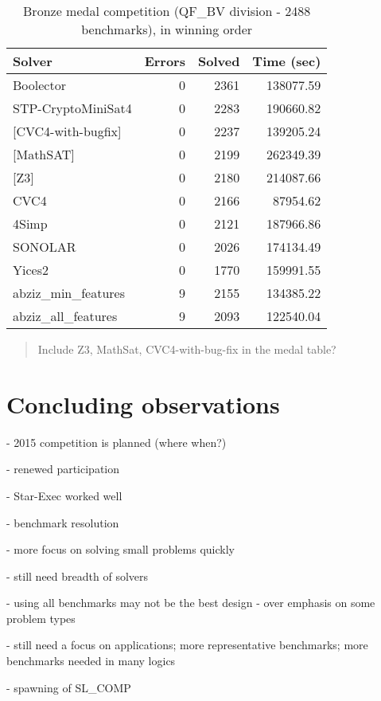 \documentclass[twosize,11pt]{article}
\newcommand{\comment}[2]{\begin{quote}\sc #1\marginpar{\textcolor{red}{$\ast^{\mbox{#2}}$}}\end{quote}}
\newcommand{\davidc}[1]{\comment{#1}{DC}}
\begin{document}
\begin{table}
\centering
\begin{tabular}{|l|rrr|}
\hline
 Solver & Errors & Solved & Time (sec)\\
\hline
Boolector &	0  &		2361  &		138077.59 \\
STP-CryptoMiniSat4 & 0  &		2283  &		190660.82 	\\
{[}CVC4-with-bugfix] &	0  &		2237 	 &		139205.24 \\
{[}MathSAT]  &	0  &		2199 	 &		262349.39 \\
{[}Z3]  & 	0  &		2180 	 &		214087.66 	\\
CVC4  &	0  &		2166 	 &		87954.62 	\\
4Simp &	0 &	2121 	 &		187966.86 \\
SONOLAR &	0  &		2026  &	 	174134.49 \\
Yices2 &	0  &		1770  &	 	159991.55 \\
abziz\_min\_features &	9  &		2155 	 &	 	134385.22 \\
abziz\_all\_features &	9  &		2093 	 &	 	122540.04 \\
\hline
\end{tabular}
\vspace{.2in}
\caption{Bronze medal competition (QF\_BV division - 2488 benchmarks), in winning order}
\label{Table:bronze}
\end{table}

\davidc{Include Z3, MathSat, CVC4-with-bug-fix in the medal table?}


\section{Concluding observations}
\label{sec:conclusion}

- 2015 competition is planned (where when?)

- renewed participation

- Star-Exec worked well

- benchmark resolution

- more focus on solving small problems quickly

- still need breadth of solvers

- using all benchmarks may not be the best design - over emphasis on some problem types

- still need a focus on applications; more representative benchmarks; more benchmarks needed in many logics

- spawning of SL\_COMP
\end{document}

